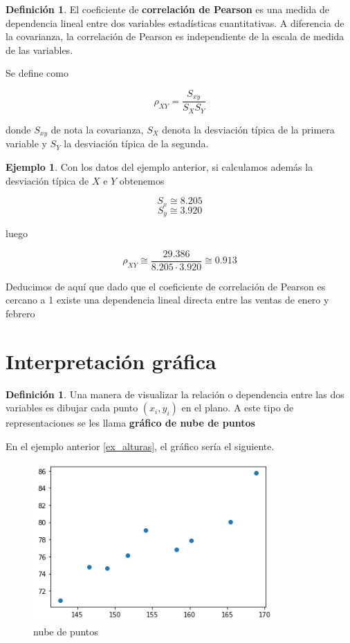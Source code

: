 \documentclass[]{book}
\theoremstyle{plain}
\theoremstyle{definition}
\newtheorem{definition}[theorem]{Definición}
\newtheorem{example}[theorem]{Ejemplo}
\begin{document}
\begin{definition}
  El coeficiente de \textbf{correlación de Pearson} es una medida de
dependencia lineal entre dos variables estadísticas cuantitativas. A
diferencia de la covarianza, la correlación de Pearson es independiente
de la escala de medida de las variables.

Se define como

\[\rho_{XY} = \frac{S_{xy}}{S_X S_Y}\]

donde \(S_{xy}\) de nota la covarianza, \(S_X\) denota la desviación
típica de la primera variable y \(S_Y\) la desviación típica de la
segunda.
\end{definition}

\begin{example}
  Con los datos del ejemplo anterior, si calculamos además la desviación típica de
\(X\) e \(Y\) obtenemos

\[S_x \cong 8.205\] \[S_y \cong 3.920\]

luego

\[\rho_{XY}\cong\frac{29.386}{8.205 \cdot 3.920} \cong 0.913\]

Deducimos de aquí que dado que el coeficiente de correlación de Pearson
es cercano a 1 existe una dependencia lineal directa entre las ventas de
enero y febrero

\end{example}


\section{Interpretación gráfica}
\begin{definition}
  Una manera de visualizar la relación o dependencia entre las dos
variables es dibujar cada punto \((x_i, y_i)\) en el plano.
 A este tipo de representaciones se les llama \textbf{gráfico de nube de puntos}
\end{definition}

En el ejemplo anterior \ref{ex_alturas}, el gráfico sería el siguiente.

\begin{figure}
\centering
\includegraphics[width=3.64583in,height=\textheight]{img/cloud.png}
\caption{nube de puntos}
\end{figure}
\end{document}
